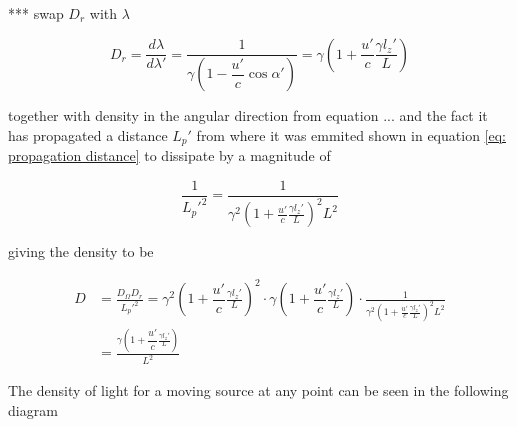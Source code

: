 *** swap $D_r$ with $\lambda$

\begin{equation}
	\label{eq: radial density}
	D_{r} = \frac{d\lambda}{d\lambda{'}} = \frac{1}{ {\gamma} \left(1-\dfrac{u{'}}{c} \cos\alpha{'} \right)} = {\gamma}\left(1 + \dfrac{u'}{c}\frac{\gamma l_z'}{L}\right)
\end{equation}

together with density in the angular direction from equation ... and the fact it has propagated a distance $L_p'$ from where it was emmited shown in equation \eqref{eq: propagation distance} to dissipate by a magnitude of

\begin{equation}
	\frac{1}{L_p'^2} = \frac{1}{\gamma^2 \left( 1 + \frac{u'}{c} \frac{\gamma l_z'}{L} \right)^2 L^2}
\end{equation}

giving the density to be

\begin{equation}
	\begin{aligned}
		D &= \frac{D_\Omega D_r}{L_p'^2} =  {\gamma}^2\left(1 + \dfrac{u'}{c}\frac{\gamma l_z'}{L}\right)^2 \cdot {\gamma}\left(1 + \dfrac{u'}{c}\frac{\gamma l_z'}{L}\right) \cdot \frac{1}{\gamma^2 \left( 1 + \frac{u'}{c} \frac{\gamma l_z'}{L} \right)^2 L^2} \\
		&= \frac{{\gamma}\left(1 + \dfrac{u'}{c}\frac{\gamma l_z'}{L}\right)}{L^2}
	\end{aligned}
\end{equation}

The density of light for a moving source at any point can be seen in the following diagram


